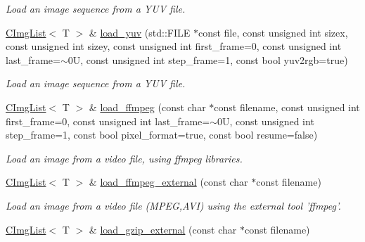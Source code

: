 \begin{DoxyCompactItemize}
\begin{DoxyCompactList}\small\item\em Load an image sequence from a YUV file. \item\end{DoxyCompactList}\item 
\hypertarget{structcimg__library_1_1CImgList_a9ddeb969d91ce1cb23167d83d0144a94}{
\hyperlink{structcimg__library_1_1CImgList}{CImgList}$<$ T $>$ \& \hyperlink{structcimg__library_1_1CImgList_a9ddeb969d91ce1cb23167d83d0144a94}{load\_\-yuv} (std::FILE $\ast$const file, const unsigned int sizex, const unsigned int sizey, const unsigned int first\_\-frame=0, const unsigned int last\_\-frame=$\sim$0U, const unsigned int step\_\-frame=1, const bool yuv2rgb=true)}
\label{structcimg__library_1_1CImgList_a9ddeb969d91ce1cb23167d83d0144a94}

\begin{DoxyCompactList}\small\item\em Load an image sequence from a YUV file. \item\end{DoxyCompactList}\item 
\hypertarget{structcimg__library_1_1CImgList_ac90b30e0027691debb81df26216b81c0}{
\hyperlink{structcimg__library_1_1CImgList}{CImgList}$<$ T $>$ \& \hyperlink{structcimg__library_1_1CImgList_ac90b30e0027691debb81df26216b81c0}{load\_\-ffmpeg} (const char $\ast$const filename, const unsigned int first\_\-frame=0, const unsigned int last\_\-frame=$\sim$0U, const unsigned int step\_\-frame=1, const bool pixel\_\-format=true, const bool resume=false)}
\label{structcimg__library_1_1CImgList_ac90b30e0027691debb81df26216b81c0}

\begin{DoxyCompactList}\small\item\em Load an image from a video file, using ffmpeg libraries. \item\end{DoxyCompactList}\item 
\hypertarget{structcimg__library_1_1CImgList_aa3885ef29cd5036361c12d407019de6c}{
\hyperlink{structcimg__library_1_1CImgList}{CImgList}$<$ T $>$ \& \hyperlink{structcimg__library_1_1CImgList_aa3885ef29cd5036361c12d407019de6c}{load\_\-ffmpeg\_\-external} (const char $\ast$const filename)}
\label{structcimg__library_1_1CImgList_aa3885ef29cd5036361c12d407019de6c}

\begin{DoxyCompactList}\small\item\em Load an image from a video file (MPEG,AVI) using the external tool 'ffmpeg'. \item\end{DoxyCompactList}\item 
\hypertarget{structcimg__library_1_1CImgList_a0ab64a5a6414629623467ad5ee80b6fe}{
\hyperlink{structcimg__library_1_1CImgList}{CImgList}$<$ T $>$ \& \hyperlink{structcimg__library_1_1CImgList_a0ab64a5a6414629623467ad5ee80b6fe}{load\_\-gzip\_\-external} (const char $\ast$const filename)}
\label{structcimg__library_1_1CImgList_a0ab64a5a6414629623467ad5ee80b6fe}


\end{DoxyCompactItemize}
